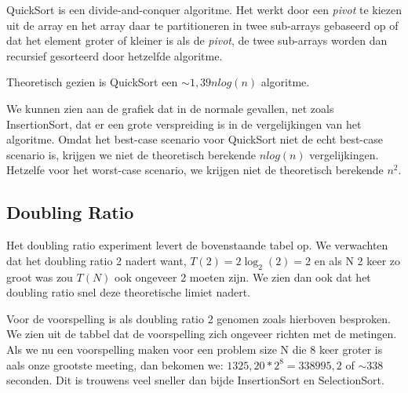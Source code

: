 QuickSort is een divide-and-conquer algoritme. Het werkt door een \textit{pivot} te kiezen uit de array en het array daar te partitioneren in twee sub-arrays gebaseerd op of dat het element groter of kleiner is als de \textit{pivot}, de twee sub-arrays worden dan recursief gesorteerd door hetzelfde algoritme.

Theoretisch gezien is QuickSort een \(\sim 1,39nlog(n)\) algoritme.

We kunnen zien aan de grafiek dat in de normale gevallen, net zoals InsertionSort, dat er een grote verspreiding is in de vergelijkingen van het algoritme. Omdat het best-case scenario voor QuickSort niet de echt best-case scenario is, krijgen we niet de theoretisch berekende \(nlog(n)\) vergelijkingen. Hetzelfe voor het worst-case scenario, we krijgen niet de theoretisch berekende \(n^2\).

\newpage

\subsection{Doubling Ratio}



Het doubling ratio experiment levert de bovenstaande tabel op. We verwachten dat het doubling ratio 2 nadert want, \(T(2)=2\log_2(2)=2\) en als N 2 keer zo groot was zou \(T(N)\) ook ongeveer 2 moeten zijn. We zien dan ook dat het doubling ratio snel deze theoretische limiet nadert.



Voor de voorspelling is als doubling ratio 2 genomen zoals hierboven besproken. We zien uit de tabbel dat de voorspelling zich ongeveer richten met de metingen. Als we nu een voorspelling maken voor een problem size N die 8 keer groter is aals onze grootste meeting, dan bekomen we: \(1325,20*2^8=338995,2\) of \(\sim 338\) seconden. Dit is trouwens veel sneller dan bijde InsertionSort en SelectionSort.
